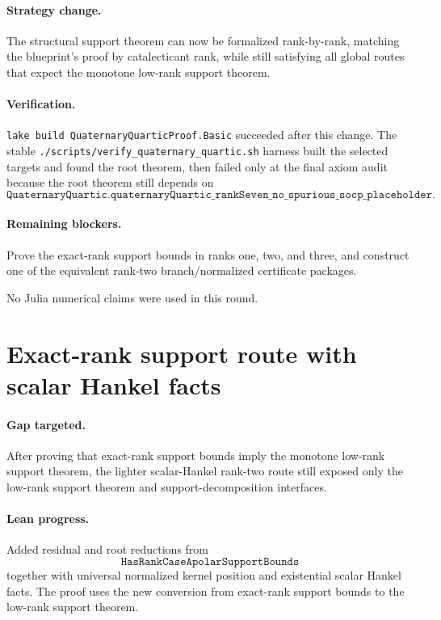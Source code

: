\documentclass[11pt]{article}
\begin{document}
\paragraph{Strategy change.}
The structural support theorem can now be formalized rank-by-rank, matching the
blueprint's proof by catalecticant rank, while still satisfying all global
routes that expect the monotone low-rank support theorem.

\paragraph{Verification.}
\texttt{lake build QuaternaryQuarticProof.Basic} succeeded after this change.
The stable \texttt{./scripts/verify\_quaternary\_quartic.sh} harness built the
selected targets and found the root theorem, then failed only at the final axiom
audit because the root theorem still depends on
\[
\texttt{QuaternaryQuartic.quaternaryQuartic\_rankSeven\_no\_spurious\_socp\_placeholder}.
\]

\paragraph{Remaining blockers.}
Prove the exact-rank support bounds in ranks one, two, and three, and construct
one of the equivalent rank-two branch/normalized certificate packages.

No Julia numerical claims were used in this round.

\section*{Exact-rank support route with scalar Hankel facts}

\paragraph{Gap targeted.}
After proving that exact-rank support bounds imply the monotone low-rank support
theorem, the lighter scalar-Hankel rank-two route still exposed only the
low-rank support theorem and support-decomposition interfaces.

\paragraph{Lean progress.}
Added residual and root reductions from
\[
\texttt{HasRankCaseApolarSupportBounds}
\]
together with universal normalized kernel position and existential scalar
Hankel facts.  The proof uses the new conversion from exact-rank support bounds
to the low-rank support theorem.
\end{document}
